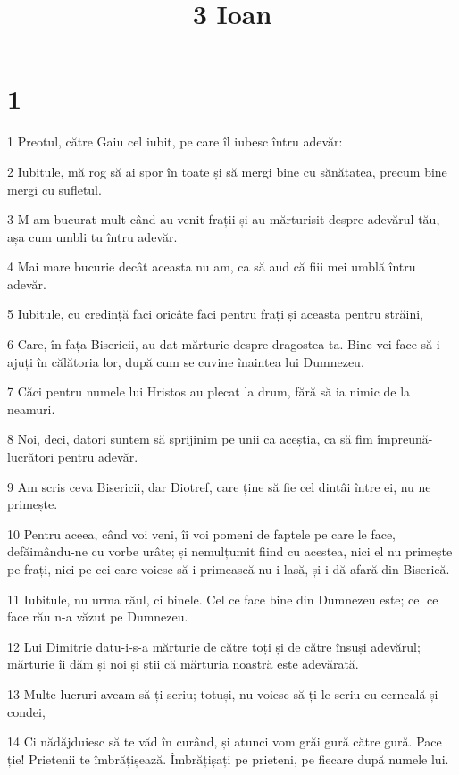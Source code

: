 

\title{3 Ioan}


\chapter{1}

\par 1 Preotul, către Gaiu cel iubit, pe care îl iubesc întru adevăr:
\par 2 Iubitule, mă rog să ai spor în toate și să mergi bine cu sănătatea, precum bine mergi cu sufletul.
\par 3 M-am bucurat mult când au venit frații și au mărturisit despre adevărul tău, așa cum umbli tu întru adevăr.
\par 4 Mai mare bucurie decât aceasta nu am, ca să aud că fiii mei umblă întru adevăr.
\par 5 Iubitule, cu credință faci oricâte faci pentru frați și aceasta pentru străini,
\par 6 Care, în fața Bisericii, au dat mărturie despre dragostea ta. Bine vei face să-i ajuți în călătoria lor, după cum se cuvine înaintea lui Dumnezeu.
\par 7 Căci pentru numele lui Hristos au plecat la drum, fără să ia nimic de la neamuri.
\par 8 Noi, deci, datori suntem să sprijinim pe unii ca aceștia, ca să fim împreună-lucrători pentru adevăr.
\par 9 Am scris ceva Bisericii, dar Diotref, care ține să fie cel dintâi între ei, nu ne primește.
\par 10 Pentru aceea, când voi veni, îi voi pomeni de faptele pe care le face, defăimându-ne cu vorbe urâte; și nemulțumit fiind cu acestea, nici el nu primește pe frați, nici pe cei care voiesc să-i primească nu-i lasă, și-i dă afară din Biserică.
\par 11 Iubitule, nu urma răul, ci binele. Cel ce face bine din Dumnezeu este; cel ce face rău n-a văzut pe Dumnezeu.
\par 12 Lui Dimitrie datu-i-s-a mărturie de către toți și de către însuși adevărul; mărturie îi dăm și noi și știi că mărturia noastră este adevărată.
\par 13 Multe lucruri aveam să-ți scriu; totuși, nu voiesc să ți le scriu cu cerneală și condei,
\par 14 Ci nădăjduiesc să te văd în curând, și atunci vom grăi gură către gură. Pace ție! Prietenii te îmbrățișează. Îmbrățișați pe prieteni, pe fiecare după numele lui.


